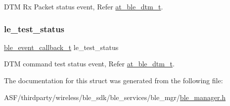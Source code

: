D\+TM Rx Packet status event, Refer \mbox{\hyperlink{structat__ble__dtm__t}{at\+\_\+ble\+\_\+dtm\+\_\+t}}. 

\mbox{\label{structble__dtm__event__cb_a4fe7435087a5a73690994a8ced7b241f}} 
\subsubsection{\texorpdfstring{le\_test\_status}{le\_test\_status}}
{\footnotesize\ttfamily \mbox{\hyperlink{ble__manager_8h_a04ce4bb8cb8282f2762e3924b1773cc9}{ble\+\_\+event\+\_\+callback\+\_\+t}} le\+\_\+test\+\_\+status}



D\+TM command test status event, Refer \mbox{\hyperlink{structat__ble__dtm__t}{at\+\_\+ble\+\_\+dtm\+\_\+t}}. 



The documentation for this struct was generated from the following file\+:\begin{DoxyCompactItemize}
\item 
A\+S\+F/thirdparty/wireless/ble\+\_\+sdk/ble\+\_\+services/ble\+\_\+mgr/\mbox{\hyperlink{ble__manager_8h}{ble\+\_\+manager.\+h}}\end{DoxyCompactItemize}
